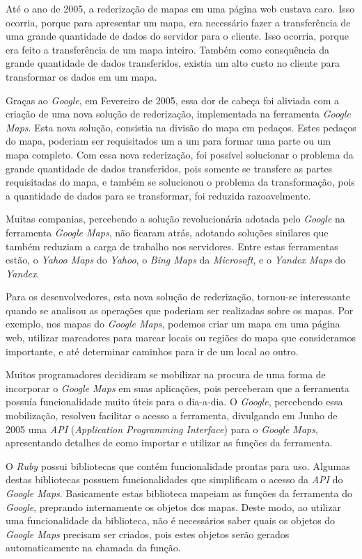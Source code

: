 Até o ano de 2005, a rederização de mapas em uma página web custava caro. Isso ocorria,
porque para apresentar um mapa, era necessário fazer a transferência de uma grande
quantidade de dados do servidor para o cliente. Isso ocorria, porque era feito a
transferência de um mapa inteiro. Também como consquência da grande quantidade de dados
transferidos, existia um alto custo no cliente para transformar os dados em um mapa.

Graças ao \emph{Google}, em Fevereiro de 2005, essa dor de cabeça foi aliviada com a criação
de uma nova solução de rederização, implementada na ferramenta \emph{Google Maps}. Esta nova
solução, consistia na divisão do mapa em pedaços. Estes pedaços do mapa, poderiam ser
requisitados um a um para formar uma parte ou um mapa completo. Com essa nova rederização,
foi possível solucionar o problema da grande quantidade de dados transferidos, pois somente
se transfere as partes requisitadas do mapa, e também se solucionou o problema da transformação,
pois a quantidade de dados para se transformar, foi reduzida razoavelmente.

Muitas companias, percebendo a solução revolucionária adotada pelo \emph{Google} na
ferramenta \emph{Google Maps}, não ficaram atrás, adotando soluções sinilares que
também reduziam a carga de trabalho nos servidores. Entre estas ferramentas estão, o
\emph{Yahoo Maps} do \emph{Yahoo}, o \emph{Bing Maps} da \emph{Microsoft}, e o
\emph{Yandex Maps} do \emph{Yandex}.

Para os desenvolvedores, esta nova solução de rederização, tornou-se interessante
quando se analisou as operações que poderiam ser realizadas sobre os mapas. Por exemplo, nos
mapas do \emph{Google Maps}, podemos criar um mapa em uma página web, utilizar marcadores para
marcar locais ou regiões do mapa que consideramos importante, e até determinar caminhos
para ir de um local ao outro.

Muitos programadores decidiram se mobilizar na procura de uma forma de incorporar o
\emph{Google Maps} em suas aplicações, pois perceberam que a ferramenta possuía funcionalidade
muito úteis para o dia-a-dia. O \emph{Google}, percebendo essa mobilização, resolveu facilitar
o acesso a ferramenta, divulgando em Junho de 2005 uma \emph{API}
(\emph{Application Programming Interface}) para o \emph{Google Maps}, apresentando
detalhes de como importar e utilizar as funções da ferramenta.

O \emph{Ruby} possui bibliotecas que contém funcionalidade prontas para uso. Algumas destas
bibliotecas possuem funcionalidades que simplificam o acesso da \emph{API} do \emph{Google Maps}.
Basicamente estas biblioteca mapeiam as funções da ferramenta do \emph{Google}, preprando
internamente os objetos dos mapas. Deste modo, ao utilizar uma funcionalidade da biblioteca, não
é necessários saber quais os objetos do \emph{Google Maps} precisam ser criados, pois estes
objetos serão gerados automaticamente na chamada da função.

